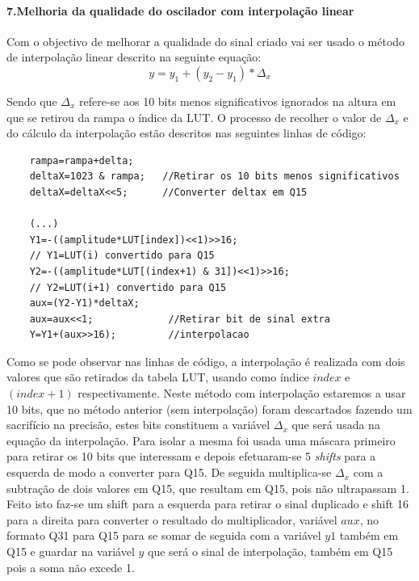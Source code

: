 \documentclass[11pt]{article}
\numberwithin{equation}{section}
\begin{document}
\paragraph{7.Melhoria da qualidade do oscilador com interpolação linear} \hspace{0pt} \label{para:P1-7}

Com o objectivo de melhorar a qualidade do sinal criado vai ser usado o método de interpolação linear descrito na seguinte equação:
\begin{equation}
y=y_{1}+(y_{2}-y_{1})*\Delta_{x}
\end{equation}                       

Sendo que $ \Delta_{x} $ refere-se aos 10 bits menos significativos ignorados na altura em que se retirou da rampa o índice da LUT. O processo de recolher o valor de $ \Delta_{x} $ e do cálculo da interpolação estão descritos nas seguintes linhas de código:

\begin{lstlisting}
	rampa=rampa+delta;
	deltaX=1023 & rampa;   //Retirar os 10 bits menos significativos
	deltaX=deltaX<<5;      //Converter deltax em Q15

	(...)
	Y1=-((amplitude*LUT[index])<<1)>>16;	
	// Y1=LUT(i) convertido para Q15
	Y2=-((amplitude*LUT[(index+1) & 31])<<1)>>16;	
	// Y2=LUT(i+1) convertido para Q15
	aux=(Y2-Y1)*deltaX;		
	aux=aux<<1;				//Retirar bit de sinal extra
	Y=Y1+(aux>>16);			//interpolacao	
\end{lstlisting}

Como se pode observar nas linhas de código, a interpolação é realizada com dois valores que são retirados da tabela LUT, usando como índice $\textit{index}$ \hspace{0,1 mm} e $(\textit{index}+1)$ respectivamente. Neste método com interpolação estaremos a usar 10 bits, que no método anterior (sem interpolação) foram descartados fazendo um sacrifício na precisão,  estes bits constituem a variável $ \Delta_{x} $ que será usada na equação da interpolação.
Para isolar a mesma foi usada uma máscara primeiro para retirar os 10 bits que interessam e depois efetuaram-se 5 \textit{shifts} para a esquerda de modo a converter para Q15. De seguida multiplica-se $\Delta_x$ com a subtração de dois valores em Q15, que resultam em Q15, pois não ultrapassam 1. Feito isto faz-se um shift para a esquerda para retirar o sinal duplicado e shift 16 para a direita para converter o resultado do multiplicador, variável $aux$, no formato Q31 para Q15 para se somar de seguida com a variável $y1$ também em Q15 e guardar na variável $y$ que será o sinal de interpolação, também em Q15 pois a soma não excede 1.
\end{document}
